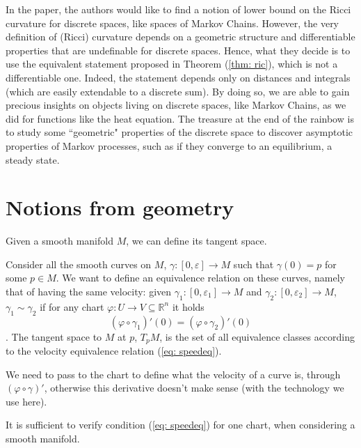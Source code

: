 \documentclass[a4paper,12pt,reqno]{amsbook}
\theoremstyle{definition} %
\newcommand{\1}{\mathbbm{1}}
\theoremstyle{plain}
\theoremstyle{remark}
\begin{document}
In the paper, the authors would like to find a notion of lower bound on the Ricci curvature for discrete spaces, like spaces of Markov Chains.
However, the very definition of (Ricci) curvature depends on a geometric structure and differentiable properties that are undefinable for discrete spaces. Hence, what they decide is to use the equivalent statement proposed in Theorem (\ref{thm: ric}), which is not a differentiable one. Indeed, the statement depends only on distances and integrals (which are easily extendable to a discrete sum).
By doing so, we are able to gain precious insights on objects living on discrete spaces, like Markov Chains, as we did for functions like the heat equation. The treasure at the end of the rainbow is to study some ``geometric" properties of the discrete space to discover asymptotic properties of Markov processes, such as if they converge to an equilibrium, a steady state.


\newpage
\chapter{Notions from geometry}

Given a smooth manifold $M$, we can define its tangent space. 
\begin{definition}\label{def: tpm}
    Consider all the smooth curves on $M$, $\gamma:[0,\varepsilon]\to M$ such that $\gamma(0) = p$ for some $p \in M$. We want to define an equivalence relation on these curves, namely that of having the same velocity: given $\gamma_1:[0,\varepsilon_1]\to M$ and $  \gamma_2:[0,\varepsilon_2]\to M$, $\gamma_1 \sim \gamma_2$ if for any chart $\varphi: U \to V \subseteq \mathbb{R}^n$ it holds \begin{equation}\label{eq: speedeq} (\varphi \circ \gamma_1)'(0) = (\varphi \circ \gamma_2)'(0)
    \end{equation}. The tangent space to $M$ at $p$, $T_pM$, is the set of all equivalence classes according to the velocity equivalence relation (\ref{eq: speedeq}). 
\end{definition}

\begin{remark}
    We need to pass to the chart to define what the velocity of a curve is, through $(\varphi \circ \gamma)'$, otherwise this derivative doesn't make sense (with the technology we use here).
\end{remark}

\begin{remark}
    It is sufficient to verify condition (\ref{eq: speedeq}) for one chart, when considering a smooth manifold. 
\end{remark}
\end{document}
